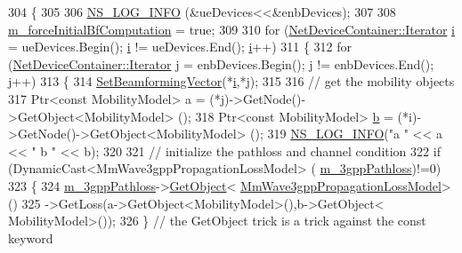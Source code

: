 \begin{DoxyCode}
304 \{
305 
306         \hyperlink{group__logging_gafbd73ee2cf9f26b319f49086d8e860fb}{NS\_LOG\_INFO} (&ueDevices<<&enbDevices);
307 
308         \hyperlink{classns3_1_1MmWave3gppChannel_a2d5a32e24f0d795c5ed210f8c38f4e9b}{m\_forceInitialBfComputation} = \textcolor{keyword}{true};
309 
310         \textcolor{keywordflow}{for} (\hyperlink{classns3_1_1NetDeviceContainer_a45709bb572f975569ed985fa89b132f8}{NetDeviceContainer::Iterator} \hyperlink{bernuolliDistribution_8m_a6f6ccfcf58b31cb6412107d9d5281426}{i} = ueDevices.Begin(); 
      \hyperlink{bernuolliDistribution_8m_a6f6ccfcf58b31cb6412107d9d5281426}{i} != ueDevices.End(); \hyperlink{bernuolliDistribution_8m_a6f6ccfcf58b31cb6412107d9d5281426}{i}++)
311         \{
312                 \textcolor{keywordflow}{for} (\hyperlink{classns3_1_1NetDeviceContainer_a45709bb572f975569ed985fa89b132f8}{NetDeviceContainer::Iterator} j = enbDevices.Begin(); j != 
      enbDevices.End(); j++)
313                 \{
314                         \hyperlink{classns3_1_1MmWave3gppChannel_a47452fa275fee0e056f646379ccc9288}{SetBeamformingVector}(*\hyperlink{bernuolliDistribution_8m_a6f6ccfcf58b31cb6412107d9d5281426}{i},*j);
315 
316                         \textcolor{comment}{// get the mobility objects}
317                         Ptr<const MobilityModel> a = (*j)->GetNode()->GetObject<MobilityModel> ();
318                         Ptr<const MobilityModel> \hyperlink{buildings__pathloss_8m_a21ad0bd836b90d08f4cf640b4c298e7c}{b} = (*i)->GetNode()->GetObject<MobilityModel> ();
319                         \hyperlink{group__logging_gafbd73ee2cf9f26b319f49086d8e860fb}{NS\_LOG\_INFO}(\textcolor{stringliteral}{"a "} << a << \textcolor{stringliteral}{" b "} << b);
320 
321                         \textcolor{comment}{// initialize the pathloss and channel condition}
322                         \textcolor{keywordflow}{if} (DynamicCast<MmWave3gppPropagationLossModel> (
      \hyperlink{classns3_1_1MmWave3gppChannel_add8860051acacb1819be2f7321dbd726}{m\_3gppPathloss})!=0)
323                         \{
324                                 \hyperlink{classns3_1_1MmWave3gppChannel_add8860051acacb1819be2f7321dbd726}{m\_3gppPathloss}->\hyperlink{classns3_1_1Object_a13e18c00017096c8381eb651d5bd0783}{GetObject}<
      \hyperlink{classMmWave3gppPropagationLossModel}{MmWave3gppPropagationLossModel}> ()
325                                                 ->GetLoss(a->GetObject<MobilityModel>(),b->GetObject<
      MobilityModel>());
326                         \}                       \textcolor{comment}{// the GetObject trick is a trick against the const keyword}

\end{DoxyCode}
